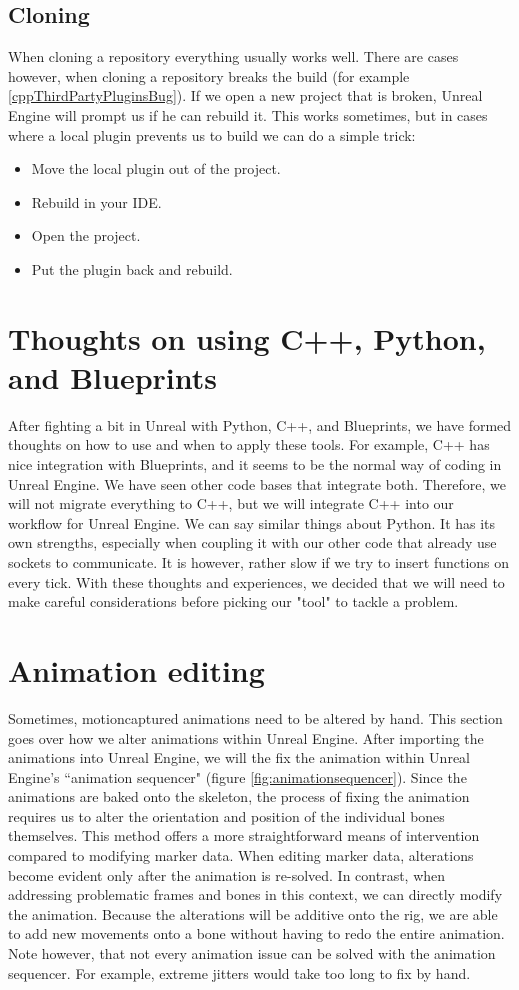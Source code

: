 \documentclass{uva-inf-article}
\begin{document}
\subsection{Cloning}\label{cloning}
When cloning a repository everything usually works well. There are cases however, when cloning a repository breaks the build (for example \ref{cppThirdPartyPluginsBug}).
If we open a new project that is broken, Unreal Engine will prompt us if he can rebuild it. This works sometimes, but in cases where a local plugin prevents us to build we can do a simple trick:
\begin{itemize}
    \item Move the local plugin out of the project.
    \item Rebuild in your IDE.
    \item Open the project.
    \item Put the plugin back and rebuild.
\end{itemize}

\section{Thoughts on using C++, Python, and Blueprints}
After fighting a bit in Unreal with Python, C++, and Blueprints, we have formed thoughts on how to use and when to apply these tools. For example, C++ has nice integration with Blueprints, and it seems to be the normal way of coding in Unreal Engine. We have seen other code bases that integrate both. Therefore, we will not migrate everything to C++, but we will integrate C++ into our workflow for Unreal Engine. We can say similar things about Python. It has its own strengths, especially when coupling it with our other code that already use sockets to communicate. It is however, rather slow if we try to insert functions on every tick. With these thoughts and experiences, we decided that we will need to make careful considerations before picking our "tool" to tackle a problem.

\section{Animation editing}
Sometimes, motioncaptured animations need to be altered by hand. This section goes over how we alter animations within Unreal Engine. After importing the animations into Unreal Engine, we will the fix the animation within Unreal Engine's ``animation sequencer" (figure \ref{fig:animationsequencer}). Since the animations are baked onto the skeleton, the process of fixing the animation requires us to alter the orientation and position of the individual bones themselves. This method offers a more straightforward means of intervention compared to modifying marker data. When editing marker data, alterations become evident only after the animation is re-solved. In contrast, when addressing problematic frames and bones in this context, we can directly modify the animation. Because the alterations will be additive onto the rig, we are able to add new movements onto a bone without having to redo the entire animation. Note however, that not every animation issue can be solved with the animation sequencer. For example, extreme jitters would take too long to fix by hand.
\end{document}

